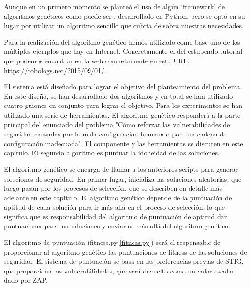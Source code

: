 Aunque en un primero momento se planteó el uso de algún `framework' de algoritmos genéticos como puede ser , desarrollado en Python, pero se optó en su lugar por utilizar un algoritmo sencillo que cubría de sobra nuestras necesidades.

\bigskip
Para la realización del algoritmo genético hemos utilizado como base uno de los múltiples ejemplos que hay en Internet. Concretamente el del estupendo tutorial que podemos encontrar en la web  concretamente en esta URL: \url{https://robologs.net/2015/09/01/}.

\bigskip
El sistema está diseñado para lograr el objetivo del planteamiento del problema. En este diseño, se han desarrollado dos algoritmos y en total se han utilizado cuatro guiones en conjunto para lograr el objetivo. Para los experimentos se han utilizado una serie de herramientas. El algoritmo genético responderá a la parte principal del enunciado del problema "Cómo reforzar las vulnerabilidades de seguridad causadas por la mala configuración humana o por una cadena de configuración inadecuada". El componente y las herramientas se discuten en este capítulo. El segundo algoritmo es puntuar la idoneidad de las soluciones.

\bigskip
El algoritmo genético se encarga de llamar a los anteriores scripts para generar soluciones de seguridad. En primer lugar, inicializa las soluciones aleatorias, que luego pasan por los procesos de selección, que se describen en detalle más adelante en este capítulo. El algoritmo genético depende de la puntuación de aptitud de cada solución para ir más allá en el proceso de selección, lo que significa que es responsabilidad del algoritmo de puntuación de aptitud dar puntuaciones para las soluciones y enviarlas más allá del algoritmo genético.

\bigskip
El algoritmo de puntuación (fitness.py \ref{fitness.py}) será el responsable de proporcionar al algoritmo genético las puntuaciones de fitness de las soluciones de seguridad. El sistema de puntuación se basa en las preferencias previas de STIG, que proporciona las vulnerabilidades, que será devuelto como un valor escalar dado por ZAP.
